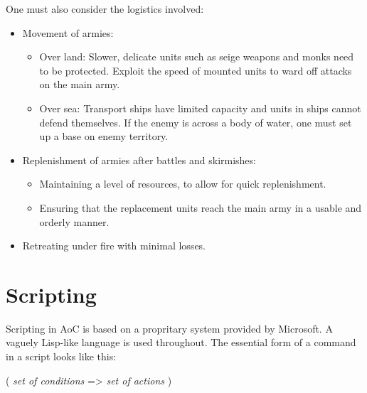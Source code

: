 \documentclass[a4paper,12pt]{article}
\begin{document}
One must also consider the logistics involved: 
\begin{itemize}
	\item Movement of armies:
	\begin{itemize}
		\item Over land:	Slower, delicate units such as seige weapons and monks need to be protected.
				Exploit the speed of mounted units to ward off attacks on the main army.
		\item Over sea:	Transport ships have limited capacity and units in ships cannot defend themselves.
				If the enemy is across a body of water, one must set up a base on enemy territory. 
	\end{itemize}
	\item Replenishment of armies after battles and skirmishes:
	\begin{itemize}
		\item Maintaining a level of resources, to allow for quick replenishment.
		\item Ensuring that the replacement units reach the main army in a usable and orderly manner.
	\end{itemize}
	\item Retreating under fire with minimal losses.
\end{itemize}

\section*{Scripting}
Scripting in AoC is based on a propritary system provided by Microsoft. A vaguely Lisp-like
language is used throughout. The essential form of a command in a script looks like this:
\begin{program}
( 
	\emph{set of conditions}
	=>
	\emph{set of actions}
)
\end{program}
\end{document}
